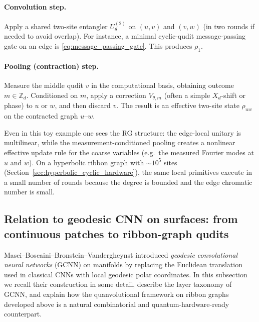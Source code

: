 \documentclass[11pt,oneside]{amsbook}
\numberwithin{equation}{section}
\theoremstyle{plain}
\theoremstyle{definition}
\theoremstyle{remark}
\begin{document}
\paragraph{Convolution step.}
Apply a shared two-site entangler $U_\theta^{(2)}$ on $(u,v)$ and $(v,w)$ (in two rounds if needed to avoid overlap).
For instance, a minimal cyclic-qudit message-passing gate on an edge is \eqref{eq:message_passing_gate}.
This produces $\rho_1$.

\paragraph{Pooling (contraction) step.}
Measure the middle qudit $v$ in the computational basis, obtaining outcome $m\in\mathbb{Z}_d$.
Conditioned on $m$, apply a correction $V_{\theta,m}$ (often a simple $X_d$-shift or phase) to $u$ or $w$,
and then discard $v$.
The result is an effective two-site state $\rho_{uw}$ on the contracted graph $u$--$w$.

Even in this toy example one sees the RG structure:
the edge-local unitary is multilinear, while the measurement-conditioned pooling creates a nonlinear effective update rule
for the coarse variables (e.g.\ the measured Fourier modes at $u$ and $w$).
On a hyperbolic ribbon graph with $\sim 10^5$ sites (Section~\ref{sec:hyperbolic_cyclic_hardware}),
the same local primitives execute in a small number of rounds because the degree is bounded and the edge chromatic number is small.

\subsection{Relation to geodesic CNN on surfaces: from continuous patches to ribbon-graph qudits}
\label{subsec:gcnn_ribbon_bridge}

Masci--Boscaini--Bronstein--Vandergheynst \cite{Masci2015GCNN} introduced \emph{geodesic convolutional neural networks} (GCNN) on manifolds by replacing the Euclidean translation used in classical CNNs with local geodesic polar coordinates.  In this subsection we recall their construction in some detail, describe the layer taxonomy of GCNN, and explain how the quanvolutional framework on ribbon graphs developed above is a natural combinatorial and quantum-hardware-ready counterpart.
\end{document}
